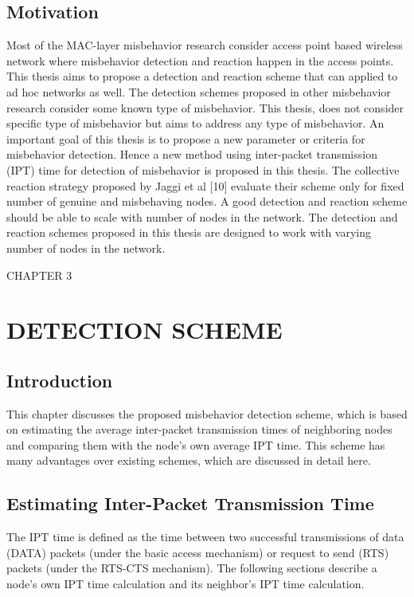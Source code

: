 \documentclass[12pt,letterpaper,english]{article}
\begin{document}
\subsection{Motivation}
\indent Most of the MAC-layer misbehavior research consider access point based wireless network where misbehavior detection and reaction happen in the access points. This thesis aims to propose a detection and reaction scheme that can applied to ad hoc networks as well. 
The detection schemes proposed in other misbehavior research consider some known type of misbehavior. This thesis, does not consider specific type of misbehavior but aims to address any type of misbehavior. 
An important goal of this thesis is to propose a new parameter or criteria for misbehavior detection. Hence a new method using inter-packet transmission (IPT) time for detection of misbehavior is proposed in this thesis.
The collective reaction strategy proposed by Jaggi et al 
[10] 
evaluate their scheme only for fixed number of genuine and misbehaving nodes. A good detection and reaction scheme should be able to scale with number of nodes in the network. The detection and reaction schemes proposed in this thesis are designed to work with varying number of nodes in the network.
\newpage
\setcounter{figure}{0}
\setcounter{table}{0}
\setcounter{subsection}{0}
\begin{singlespace}
\begin{center}
CHAPTER 3
\section*{DETECTION SCHEME}
\addtocounter{section}{1}
\label{chapter:detection}
\end{center}
\end{singlespace}
\subsection{Introduction}
\indent This chapter discusses the proposed misbehavior detection scheme, which is based on estimating the average inter-packet transmission times of neighboring nodes and comparing them with the node's own average IPT time. This scheme has many advantages over existing schemes, which are discussed in detail here.
\subsection{Estimating Inter-Packet Transmission Time}
\indent The IPT time is defined as the time between two successful transmissions of data (DATA) packets (under the basic access mechanism) or request to send (RTS) packets (under the RTS-CTS mechanism). The following sections describe a node's own IPT time calculation and its neighbor's IPT time calculation.
\end{document}
